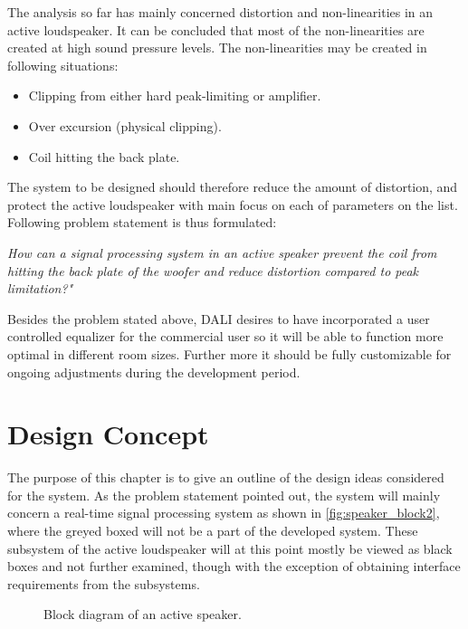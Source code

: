 The analysis so far has mainly concerned distortion and non-linearities in an active loudspeaker. It can be concluded that most of the non-linearities are created at high sound pressure levels. The non-linearities may be created in following situations:
\begin{itemize}
\item Clipping from either hard peak-limiting or amplifier.
\item Over excursion (physical clipping).
\item Coil hitting the back plate.
\end{itemize}

The system to be designed should therefore reduce the amount of distortion, and protect the active loudspeaker with main focus on each of parameters on the list. Following problem statement is thus formulated:


\begin{center}
\label{ProblemStatement}
\textit{How can a signal processing system in an active speaker prevent the coil from hitting the back plate of the woofer and reduce distortion compared to peak limitation?"}
\end{center}
Besides the problem stated above, DALI desires to have incorporated a user controlled equalizer for the commercial user so it will be able to function more optimal in different room sizes. Further more it should be fully customizable for ongoing adjustments during the development period.


\chapter{Design Concept}
The purpose of this chapter is to give an outline of the design ideas considered for the system. As the problem statement pointed out, the system will mainly concern a real-time signal processing system as shown in \autoref{fig:speaker_block2}, where the greyed boxed will not be a part of the developed system. These subsystem of the active loudspeaker will at this point mostly be viewed as black boxes and not further examined, though with the exception of obtaining interface requirements from the subsystems.

\begin{figure}[H]
\centering
{}
\scalebox{0.9}{
}
\caption{Block diagram of an active speaker.}
\label{fig:speaker_block2}
\end{figure}

